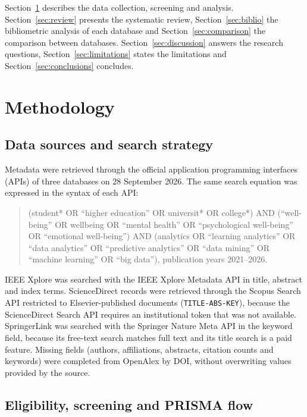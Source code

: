 \documentclass[11pt,a4paper]{article}
\begin{document}
Section~\ref{sec:method} describes the data collection, screening and analysis. Section~\ref{sec:review} presents the systematic review, Section~\ref{sec:biblio} the bibliometric analysis of each database and Section~\ref{sec:comparison} the comparison between databases. Section~\ref{sec:discussion} answers the research questions, Section~\ref{sec:limitations} states the limitations and Section~\ref{sec:conclusions} concludes.

\section{Methodology}\label{sec:method}

\subsection{Data sources and search strategy}

Metadata were retrieved through the official application programming interfaces (APIs) of three databases on 28 September 2026. The same search equation was expressed in the syntax of each API:

\begin{quote}\small
(student* OR ``higher education'' OR universit* OR college*) AND (``well-being'' OR wellbeing OR ``mental health'' OR ``psychological well-being'' OR ``emotional well-being'') AND (analytics OR ``learning analytics'' OR ``data analytics'' OR ``predictive analytics'' OR ``data mining'' OR ``machine learning'' OR ``big data''), publication years 2021--2026.
\end{quote}

IEEE Xplore was searched with the IEEE Xplore Metadata API in title, abstract and index terms. ScienceDirect records were retrieved through the Scopus Search API restricted to Elsevier-published documents (\texttt{TITLE-ABS-KEY}), because the ScienceDirect Search API requires an institutional token that was not available. SpringerLink was searched with the Springer Nature Meta API in the keyword field, because its free-text search matches full text and its title search is a paid feature. Missing fields (authors, affiliations, abstracts, citation counts and keywords) were completed from OpenAlex \cite{priem2022openalex} by DOI, without overwriting values provided by the source.

\subsection{Eligibility, screening and PRISMA flow}
\end{document}
